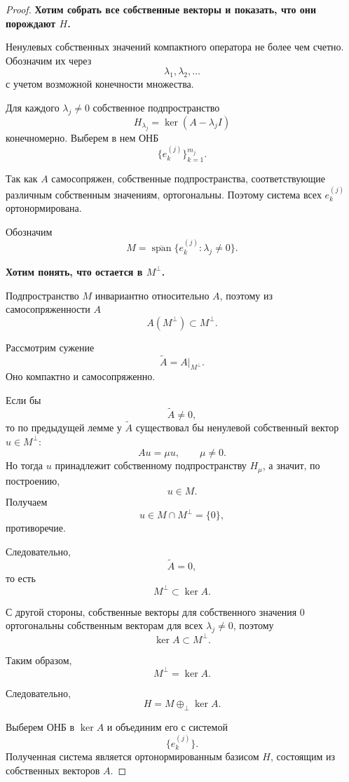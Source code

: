 \begin{proof}
	\textbf{Хотим собрать все собственные векторы и показать, что они порождают \(H\).}
	
	Ненулевых собственных значений компактного оператора не более чем счетно.
	Обозначим их через
	\[
	\lambda_1,\lambda_2,\ldots
	\]
	с учетом возможной конечности множества.
	
	Для каждого \(\lambda_j\neq0\) собственное подпространство
	\[
	H_{\lambda_j}=\ker(A-\lambda_jI)
	\]
	конечномерно. Выберем в нем ОНБ
	\[
	\{e_k^{(j)}\}_{k=1}^{m_j}.
	\]
	
	Так как \(A\) самосопряжен, собственные подпространства,
	соответствующие различным собственным значениям, ортогональны.
	Поэтому система всех \(e_k^{(j)}\) ортонормирована.
	
	Обозначим
	\[
	M=
	\overline{\operatorname{span}}
	\{e_k^{(j)}:\lambda_j\neq0\}.
	\]
	
	\textbf{Хотим понять, что остается в \(M^\perp\).}
	
	Подпространство \(M\) инвариантно относительно \(A\), поэтому
	из самосопряженности \(A\)
	\[
	A(M^\perp)\subset M^\perp.
	\]
	
	Рассмотрим сужение
	\[
	\widetilde A=A|_{M^\perp}.
	\]
	Оно компактно и самосопряженно.
	
	Если бы
	\[
	\widetilde A\neq0,
	\]
	то по предыдущей лемме у \(\widetilde A\) существовал бы ненулевой
	собственный вектор \(u\in M^\perp\):
	\[
	Au=\mu u,
	\qquad
	\mu\neq0.
	\]
	Но тогда \(u\) принадлежит собственному подпространству \(H_\mu\),
	а значит, по построению,
	\[
	u\in M.
	\]
	Получаем
	\[
	u\in M\cap M^\perp=\{0\},
	\]
	противоречие.
	
	Следовательно,
	\[
	\widetilde A=0,
	\]
	то есть
	\[
	M^\perp\subset\ker A.
	\]
	
	С другой стороны, собственные векторы для собственного значения \(0\)
	ортогональны собственным векторам для всех \(\lambda_j\neq0\), поэтому
	\[
	\ker A\subset M^\perp.
	\]
	
	Таким образом,
	\[
	\boxed{M^\perp=\ker A}.
	\]
	
	Следовательно,
	\[
	H=M\oplus_{\perp}\ker A.
	\]
	
	Выберем ОНБ в \(\ker A\) и объединим его с системой
	\[
	\{e_k^{(j)}\}.
	\]
	Полученная система является ортонормированным базисом \(H\),
	состоящим из собственных векторов \(A\).
\end{proof}

